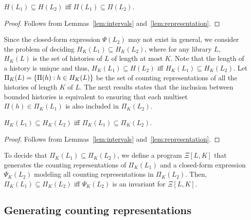 
\begin{lemma}

  $H(L_1) \subseteq H(L_2)$ iff $\Pi(L_1) \subseteq \Pi(L_2)$.

\end{lemma}

\begin{proof}

  Follows from Lemmas~\ref{lem:intervals} and~\ref{lem:representation}.

\end{proof}

Since the closed-form expression $\Psi(L_2)$ may not exist in general, we consider the problem of deciding
$H_K(L_1) \subseteq H_K(L_2)$, where for any library $L$, $H_K(L)$ is the set of histories of $L$ of length at most $K$.
Note that the length of a history is unique and thus, $H_K(L_1) \subseteq H(L_2)$ iff $H_K(L_1) \subseteq H_K(L_2)$.
Let $\Pi_K(L)={\{ \Pi(h):h\in H_K(L) \}}$ be the set of counting representations of all the histories of length $K$ of $L$.
The next results states that the inclusion between bounded histories is equivalent to ensuring that each multiset 
$\Pi(h) \in \Pi_K(L_1)$ is also included in $\Pi_K(L_2)$.

\begin{lemma}

  $H_K(L_1) \subseteq H_K(L_2)$ iff $\Pi_K(L_1) \subseteq \Pi_K(L_2)$.

\end{lemma}

\begin{proof}

  Follows from Lemmas~\ref{lem:intervals} and~\ref{lem:representation}.

\end{proof}

To decide that $\Pi_K(L_1) \subseteq \Pi_K(L_2)$, we define a program $\Xi[L,K]$ that generates the counting representations of $\Pi_K(L_1)$
and a closed-form expression $\Psi_K(L_2)$ modeling all counting representations in $\Pi_K(L_2)$. Then, $\Pi_K(L_1) \subseteq \Pi_K(L_2)$ iff 
$\Psi_K(L_2)$ is an invariant for $\Xi[L,K]$.

\subsection{Generating counting representations}



